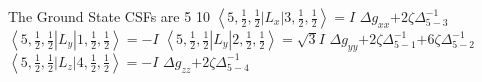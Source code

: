 \documentclass[11pt]{article}
\begin{document}
The Ground State CSFs are 5 10 \newline\newline\newline
$\left\langle5,\frac{1}{2},\frac{1}{2}\left|L_{x}\right|3,\frac{1}{2},\frac{1}{2}\right\rangle=I$\newline
\newline$\Delta g_{xx}$\newline\newline$+2\zeta \Delta_{5-3}^{-1}$\newline\newline
$\left\langle5,\frac{1}{2},\frac{1}{2}\left|L_{y}\right|1,\frac{1}{2},\frac{1}{2}\right\rangle=-I$\newline
$\left\langle5,\frac{1}{2},\frac{1}{2}\left|L_{y}\right|2,\frac{1}{2},\frac{1}{2}\right\rangle=\sqrt{3}I$\newline
\newline$\Delta g_{yy}$\newline\newline$+2\zeta \Delta_{5-1}^{-1}$\newline$+6\zeta \Delta_{5-2}^{-1}$\newline\newline
$\left\langle5,\frac{1}{2},\frac{1}{2}\left|L_{z}\right|4,\frac{1}{2},\frac{1}{2}\right\rangle=-I$\newline
\newline$\Delta g_{zz}$\newline\newline$+2\zeta \Delta_{5-4}^{-1}$\newline\newline
\end{document}
